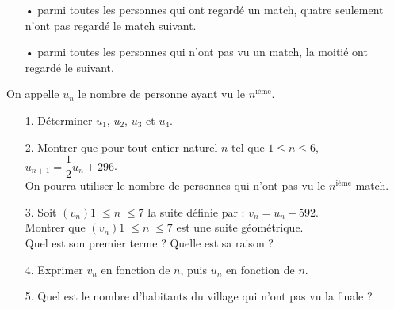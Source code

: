 \begin{itemize}
\item[•] parmi toutes les personnes qui ont regardé un match, quatre seulement n'ont pas regardé le match suivant.
\item[•] parmi toutes les personnes qui n'ont pas vu un match, la moitié ont regardé le suivant. 
\end{itemize}

\vspace*{.3cm}

On appelle $u_n$ le nombre de personne ayant vu le $n^{\mathrm{ième}}$. \\

\begin{itemize}
\item[1.] Déterminer $u_1$, $u_2$, $u_3$ et $u_4$. \\
\item[2.] Montrer que pour tout entier naturel $n$ tel que $1 \leqslant n \leqslant 6$, $u_{n+1} = \dfrac{1}{2}u_n + 296$. \\ On pourra utiliser le nombre de personnes qui n'ont pas vu le $n^{\mathrm{ième}}$ match. \\
\item[3.] Soit $\left(v_n\right){1 \; \leqslant n \; \leqslant 7}$ la suite définie par : $v_n = u_n - 592$. \\ Montrer que $\left(v_n\right){1 \; \leqslant n \; \leqslant 7}$ est une suite géométrique. \\ Quel est son premier terme ? Quelle est sa raison ? \\
\item[4.] Exprimer $v_n$ en fonction de $n$, puis $u_n$ en fonction de $n$. \\ 
\item[5.] Quel est le nombre d'habitants du village qui n'ont pas vu la finale ? \\
\end{itemize}

\vspace*{.3cm}

